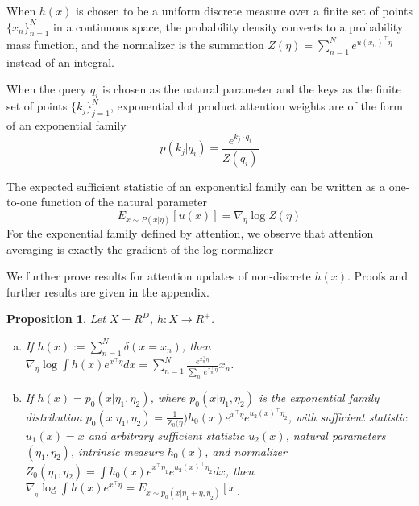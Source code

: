 \documentclass{article}
\newtheorem{proposition}{Proposition}
\begin{document}
When $h(x)$ is chosen to be a uniform discrete measure over a finite set of points 
$\{x_n\}_{n=1}^N $
in a continuous space, the probability density converts to a probability mass function, and the normalizer is the summation 
$Z( \eta ) = \sum_{n=1}^N e^{ u(x_n)^\intercal \eta} $
instead of an integral. 

When the query $q_i$ is chosen as the natural parameter and the keys as the finite set of points $\{ k_j \}_{j=1}^N$, exponential dot product attention weights are of the form of an exponential family
\begin{equation}
  p( k_j \vert q_i ) = 
  \frac
    { e^{k_j \cdot q_i } }
    { Z(q_i) }
  \label{exponential family attention}
\end{equation}

The expected sufficient statistic of an exponential family can be written as a one-to-one function of the natural parameter
\begin{equation}
  E_{ x \sim P( x \vert \eta) } \left[ u(x) \right] =
  \nabla_\eta \log Z(\eta)
  \label{activation function}
\end{equation}
For the exponential family defined by attention, we observe that attention averaging is exactly the gradient of the log normalizer

We further prove results for attention updates of non-discrete $h(x)$. Proofs and further results are given in the appendix.

\begin{proposition}
  Let $X = R^D$, $h: X \rightarrow R^{+}$. 
  \begin{enumerate}[(a)]
    \item If $h(x) := \sum_{n=1}^N \delta( x = x_n)$, then \\
    $
      \nabla_\eta \log \int h(x) e^{ x^\intercal \eta } dx 
      = \sum_{n=1}^N \frac{ e^{ x_n^\intercal \eta } }{ \sum_{n'} e^{ x_{n'}^\intercal \eta } } x_n 
    $.
    \item If $h(x) = p_0( x \vert \eta_1, \eta_2)$, where $p_0(x \vert \eta_1,\eta_2)$ is the exponential family distribution $p_0(x \vert \eta_1,\eta_2) = \frac{1}{Z_0(\eta}) h_0(x) e^{x^\intercal \eta} e^{u_2(x)^\intercal \eta_2}$, with sufficient statistic $u_1(x) = x$ and arbitrary sufficient statistic $u_2(x)$, natural parameters $(\eta_1,\eta_2)$, intrinsic measure $h_0(x)$, and normalizer $Z_0(\eta_1,\eta_2) = \int h_0(x) e^{ x^\intercal \eta_1 } e^{ u_2(x)^\intercal \eta_2 } dx$, then $\nabla_{_\eta} \log \int h(x) e^{ x^\intercal \eta} = E_{x \sim p_0(x \vert \eta_1 + \eta, \eta_2)} \left[ x \right]$
  \end{enumerate}
  \label{exponential family gradient updates}
\end{proposition}
\end{document}
